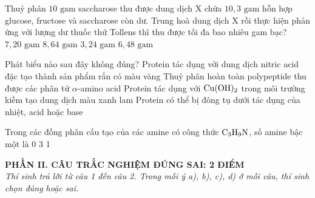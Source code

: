 \documentclass[11pt,a4paper]{article}
\begin{document}
\begin{ex}
Thuỷ phân $10\text{ gam}$ saccharose thu được dung dịch X chứa $10,3\text{ gam}$ hỗn hợp glucose, fructose và saccharose còn dư. Trung hoà dung dịch X rồi thực hiện phản ứng với lượng dư thuốc thử Tollens thì thu được tối đa bao nhiêu gam bạc?
\choice
{\True $7,20\text{ gam}$}
{$8,64\text{ gam}$}
{$3,24\text{ gam}$}
{$6,48\text{ gam}$}

\end{ex}
\begin{ex}
Phát biểu nào sau đây không đúng?
\choice
{Protein tác dụng với dung dịch nitric acid đặc tạo thành sản phẩm rắn có màu vàng}
{Thuỷ phân hoàn toàn polypeptide thu được các phân tử $\alpha$-amino acid}
{\True Protein tác dụng với $\ce{Cu(OH)2}$ trong môi trường kiềm tạo dung dịch màu xanh lam}
{Protein có thể bị đông tụ dưới tác dụng của nhiệt, acid hoặc base}

\end{ex}
\begin{ex}
Trong các đồng phân cấu tạo của các amine có công thức $\ce{C3H9N}$, số amine bậc một là
\choice
{0}
{3}
{}
{1}

\end{ex}
\vspace{4pt}
\noindent
{\color{mainGreen}\textbf{\large PHẦN II. CÂU TRẮC NGHIỆM ĐÚNG SAI: 2 ĐIỂM}}\\
\textit{\small Thí sinh trả lời từ câu 1 đến câu 2. Trong mỗi ý a), b), c), d) ở mỗi câu, thí sinh chọn đúng hoặc sai.}
\vspace{2pt}
\end{document}

